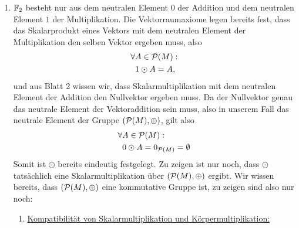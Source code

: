 \documentclass{article}
\begin{document}
\begin{enumerate}
\begin{enumerate}
		\item \ul{Inverse Elemente:} Für jedes $A \in \cP(M)$ gilt
		\begin{align*}
			A \oplus A
			&= (A \setminus A) \cup (A \setminus A)\\
			&= \emptyset \cup \emptyset\\
			&= \emptyset,
		\end{align*}
		also ist jede Menge $A \in \cP(M)$ ihr eigenes $\oplus$-inverses Element.
	\end{enumerate}
	Alternativ könnte man die Erkenntnis $(\cP(\lr{1,2}), \oplus) \cong \bZ/2\bZ \times \bZ/2\bZ$ aus der letzten Teilaufgabe verallgemeinern, indem man zeigt, dass $(\cP(M), \oplus)$ im Allgemeinen isomorph zum Gruppenprodukt $(\bZ/2\bZ)^{|M|}$ ist, woraus direkt folgt, dass $(\cP(M), \oplus)$ die Gruppenaxiome erfüllt.
	
	\item {}

	$\mathbb{F}_2$ besteht nur aus dem neutralen Element $0$ der Addition und dem neutralen Element $1$ der Multiplikation. Die Vektorraumaxiome legen bereits fest, dass das Skalarprodukt eines Vektors mit dem neutralen Element der Multiplikation den selben Vektor ergeben muss, also
	\begin{align*}
		\forall &A \in \mathcal{P}(M) :\\
		&1 \odot A = A,
	\end{align*} und aus Blatt 2 wissen wir, dass Skalarmultiplikation mit dem neutralen Element der Addition den Nullvektor ergeben muss. Da der Nullvektor genau das neutrale Element der Vektoraddition sein muss, also in unserem Fall das neutrale Element der Gruppe $(\cP(M), \oplus)$, gilt also
	\begin{align*}
		\forall &A \in \mathcal{P}(M) :\\
		&0 \odot A = 0_{\mathcal{P}(M)} = \emptyset
	\end{align*}
	Somit ist $\odot$ bereits eindeutig festgelegt. Zu zeigen ist nur noch, dass $\odot$ tatsächlich eine Skalarmultiplikation über $(\cP(M), \oplus)$ ergibt. Wir wissen bereits, dass $(\cP(M), \oplus)$ eine kommutative Gruppe ist, zu zeigen sind also nur noch:
	\begin{enumerate}
		\item \ul{Kompatibilität von Skalarmultiplikation und Körpermultiplikation:}
		

\end{enumerate}
\end{enumerate}
\end{document}
